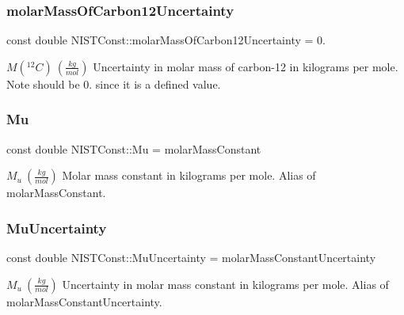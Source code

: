 \subsubsection{\texorpdfstring{molar\+Mass\+Of\+Carbon12\+Uncertainty}{molarMassOfCarbon12Uncertainty}}
{\footnotesize\ttfamily const double N\+I\+S\+T\+Const\+::molar\+Mass\+Of\+Carbon12\+Uncertainty = 0.}

$M({^{12}C}) \ (\frac{kg}{mol})$ Uncertainty in molar mass of carbon-\/12 in kilograms per mole. Note should be 0. since it is a defined value. \mbox{\label{group___n_i_s_t_const-_molar_mass_constant_ga06104635bf45affb9e10a3f6581b4076}} 
\subsubsection{\texorpdfstring{Mu}{Mu}}
{\footnotesize\ttfamily const double N\+I\+S\+T\+Const\+::\+Mu = molar\+Mass\+Constant}

$M_u \ (\frac{kg}{mol})$ Molar mass constant in kilograms per mole. Alias of molar\+Mass\+Constant. \mbox{\label{group___n_i_s_t_const-_molar_mass_constant_gacb7d27c9a39a3add815f0c8b97d5b425}} 
\subsubsection{\texorpdfstring{Mu\+Uncertainty}{MuUncertainty}}
{\footnotesize\ttfamily const double N\+I\+S\+T\+Const\+::\+Mu\+Uncertainty = molar\+Mass\+Constant\+Uncertainty}

$M_u \ (\frac{kg}{mol})$ Uncertainty in molar mass constant in kilograms per mole. Alias of molar\+Mass\+Constant\+Uncertainty. 